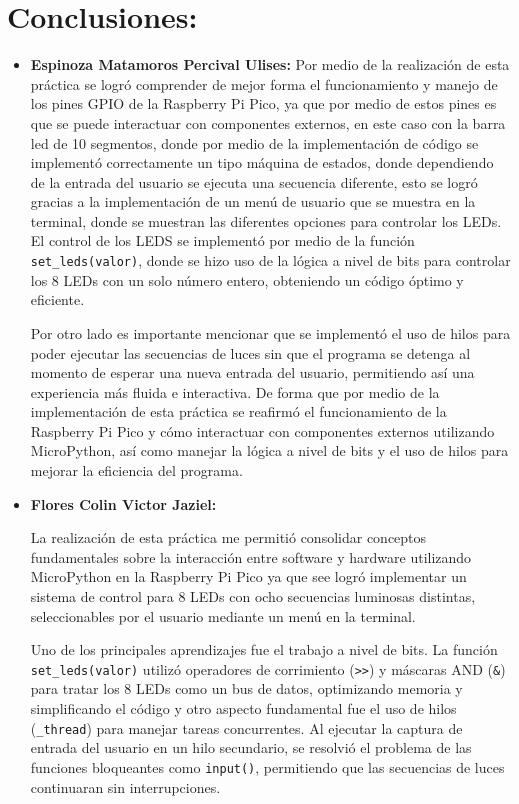\documentclass[letterpaper,12pt]{article}
\begin{document}
    \section{Conclusiones:}

    \begin{itemize}
        \item \textbf{Espinoza Matamoros Percival Ulises:}
        Por medio de la realización de esta práctica se logró comprender de mejor forma el funcionamiento y manejo de los pines GPIO de la Raspberry Pi Pico, ya que por medio de estos pines es que se puede interactuar con componentes externos, en este caso con la barra led de 10 segmentos, donde por medio de la implementación de código se implementó correctamente un tipo máquina de estados, donde dependiendo de la entrada del usuario se ejecuta una secuencia diferente, esto se logró gracias a la implementación de un menú de usuario que se muestra en la terminal, donde se muestran las diferentes opciones para controlar los LEDs. El control de los LEDS se implementó por medio de la función \texttt{set\_leds(valor)}, donde se hizo uso de la lógica a nivel de bits para controlar los 8 LEDs con un solo número entero, obteniendo un código óptimo y eficiente.
        
        Por otro lado es importante mencionar que se implementó el uso de hilos para poder ejecutar las secuencias de luces sin que el programa se detenga al momento de esperar una nueva entrada del usuario, permitiendo así una experiencia más fluida e interactiva. De forma que por medio de la implementación de esta práctica se reafirmó el funcionamiento de la Raspberry Pi Pico y cómo interactuar con componentes externos utilizando MicroPython, así como manejar la lógica a nivel de bits y el uso de hilos para mejorar la eficiencia del programa.

        \item \textbf{Flores Colin Victor Jaziel:}
        
        La realización de esta práctica me permitió consolidar conceptos fundamentales sobre la interacción entre software y hardware utilizando MicroPython en la Raspberry Pi Pico ya que see logró implementar un sistema de control para 8 LEDs con ocho secuencias luminosas distintas, seleccionables por el usuario mediante un menú en la terminal.

        Uno de los principales aprendizajes fue el trabajo a nivel de bits. La función \texttt{set\_leds(valor)} utilizó operadores de corrimiento (\texttt{>>}) y máscaras AND (\texttt{\&}) para tratar los 8 LEDs como un bus de datos, optimizando memoria y simplificando el código y otro aspecto fundamental fue el uso de hilos (\texttt{\_thread}) para manejar tareas concurrentes. Al ejecutar la captura de entrada del usuario en un hilo secundario, se resolvió el problema de las funciones bloqueantes como \texttt{input()}, permitiendo que las secuencias de luces continuaran sin interrupciones.


\end{itemize}
\end{document}

